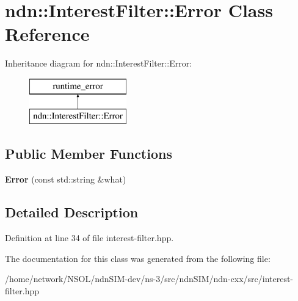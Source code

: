 \hypertarget{classndn_1_1InterestFilter_1_1Error}{}\section{ndn\+:\+:Interest\+Filter\+:\+:Error Class Reference}
\label{classndn_1_1InterestFilter_1_1Error}
Inheritance diagram for ndn\+:\+:Interest\+Filter\+:\+:Error\+:\begin{figure}[H]
\begin{center}
\leavevmode
\includegraphics[height=2.000000cm]{classndn_1_1InterestFilter_1_1Error}
\end{center}
\end{figure}
\subsection*{Public Member Functions}
\begin{DoxyCompactItemize}
\item 
{\bfseries Error} (const std\+::string \&what)\hypertarget{classndn_1_1InterestFilter_1_1Error_a65bdf3b0f430de675621f4fcf40925bd}{}\label{classndn_1_1InterestFilter_1_1Error_a65bdf3b0f430de675621f4fcf40925bd}

\end{DoxyCompactItemize}


\subsection{Detailed Description}


Definition at line 34 of file interest-\/filter.\+hpp.



The documentation for this class was generated from the following file\+:\begin{DoxyCompactItemize}
\item 
/home/network/\+N\+S\+O\+L/ndn\+S\+I\+M-\/dev/ns-\/3/src/ndn\+S\+I\+M/ndn-\/cxx/src/interest-\/filter.\+hpp\end{DoxyCompactItemize}
